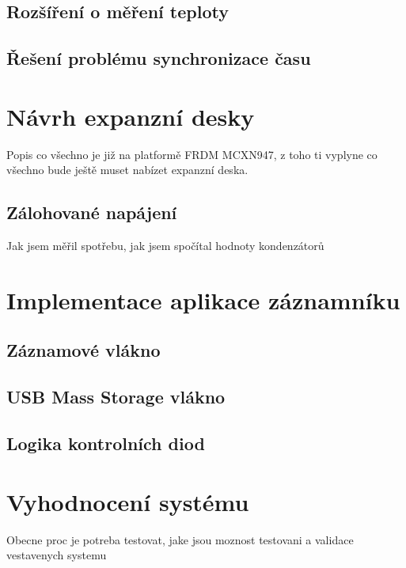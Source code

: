 
\section{Rozšíření o měření teploty}


\section{Řešení problému synchronizace času}


\chapter{Návrh expanzní desky}
Popis co všechno je již na platformě FRDM MCXN947, z toho ti vyplyne co všechno bude ještě muset nabízet expanzní deska.

\section{Zálohované napájení}
Jak jsem měřil spotřebu, jak jsem spočítal hodnoty kondenzátorů

\chapter{Implementace aplikace záznamníku}

\section{Záznamové vlákno}

\section{USB Mass Storage vlákno}

\section{Logika kontrolních diod}

\chapter{Vyhodnocení systému}
Obecne proc je potreba testovat, jake jsou moznost testovani a validace vestavenych systemu

